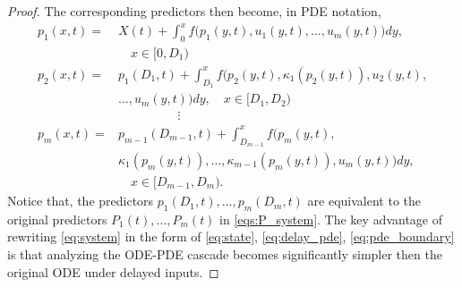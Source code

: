 \documentclass[letterpaper, 10 pt, conference]{ieeeconf}  %
\begin{document}
\begin{proof}
The corresponding predictors then become, in PDE notation, 
\begin{subequations}\label{eqs:ps}
    \begin{align}
        p_1(x,t) =& X(t) + \int_0^x f \bigg( p_1(y,t), u_1(y,t), \ldots, u_m(y,t) \bigg) dy, \label{eq:p1(x,t)}  \nonumber \\
            &\quad x \in [0, D_1) \\
        p_2(x,t) =& p_1(D_1,t) + \int_{D_1}^x f \bigg( p_2(y,t), \kappa_1(p_2(y,t)), u_2(y,t),\nonumber \\ & \ldots, u_m(y,t) \bigg) dy, \label{eq:p2(x,t)} \quad x \in [D_1, D_2) \\
        &\hspace{2cm} \vdots \nonumber \\
        p_m(x,t) =& p_{m-1}(D_{m-1},t) + \int_{D_{m-1}}^x f \bigg( p_m(y,t), \nonumber \\ &  \kappa_1(p_m(y,t)), \ldots, \kappa_{m-1}(p_m(y,t)), u_m(y,t) \bigg) dy, \label{eq:pm(x,t)} \nonumber \\
            &\quad x \in [D_{m-1}, D_m) .
    \end{align}
\end{subequations}
Notice that, the predictors $p_1(D_1, t), ..., p_m(D_m, t)$ are equivalent to the original predictors $P_1(t), ..., P_m(t)$ in \eqref{eqs:P_system}. The key advantage of rewriting \eqref{eq:system} in the form of \eqref{eq:state}, \eqref{eq:delay_pde}, \eqref{eq:pde_boundary} is that analyzing the ODE-PDE cascade becomes significantly simpler then the original ODE under delayed inputs.


\end{proof}
\end{document}
